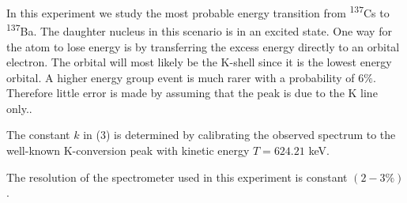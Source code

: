 \documentclass[10pt, a4paper]{article}
\begin{document}
\begin{multicols}{2}
In this experiment we study the most probable energy transition from \textsuperscript{137}Cs to \textsuperscript{137}Ba.
The daughter nucleus in this scenario is in an excited state. One way for the atom to lose energy is by transferring the excess energy directly to an orbital electron\cite{SPA}.
The orbital will most likely be the K-shell since it is the lowest energy orbital. A higher energy group event is much rarer with a probability of $6\%$. Therefore little error is made  by assuming that the peak is due to the K line only.\cite{SPA}.

The constant $k$ in (3) is determined by calibrating the observed spectrum to the well-known K-conversion peak with kinetic energy $T = 624.21$ keV.


The resolution of the spectrometer used in this experiment is constant $(2-3\%)$. 








\end{multicols}


\end{document}
